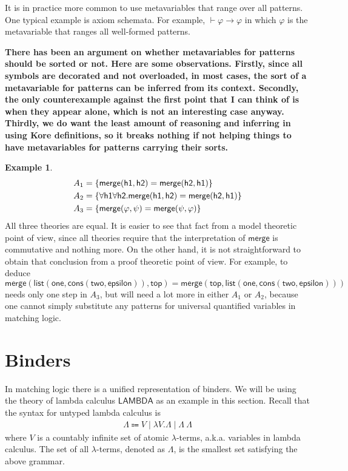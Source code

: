 \documentclass[UTF8]{article}
\newcommand{\comment}[1]
    {\par {\bfseries \color{blue} #1 \par}} %
\newcounter{thmcounter}
\theoremstyle{plain}
\theoremstyle{definition}
\newtheorem{example}[thmcounter]{Example}
\theoremstyle{remark}
\newcommand{\LAMBDA}{\mathsf{LAMBDA}}
\begin{document}
It is in practice more common to use metavariables that range over all patterns. One typical example is axiom schemata. For example, $\vdash \varphi \to \varphi$ in which $\varphi$ is the metavariable that ranges all well-formed patterns. 

\comment{There has been an argument on whether metavariables for patterns should be sorted or not. Here are some observations. Firstly, since all symbols are decorated and not overloaded, in most cases, the sort of a metavariable for patterns can be inferred from its context. Secondly, the only counterexample against the first point that I can think of is when they appear alone, which is not an interesting case anyway. Thirdly, we do want the least amount of reasoning and inferring in using Kore definitions, so it breaks nothing if not helping things to have metavariables for patterns carrying their sorts.}

\begin{example}
\begin{align*}
A_1 &= \{{\sf merge(h1, h2) = merge(h2, h1)}\} \\
A_2 &= \{{\sf \forall h1 \forall h2 . merge(h1, h2) = merge(h2, h1)}\} \\
A_3 &= \{\mathsf{merge}(\varphi, \psi) = \mathsf{merge}(\psi, \varphi)\}
\end{align*}
All three theories are equal. It is easier to see that fact from a model theoretic point of view, since all theories require that the interpretation of $\mathsf{merge}$ is commutative and nothing more. On the other hand, it is not straightforward to obtain that conclusion from a proof theoretic point of view. For example, to deduce $\mathsf{merge}(\mathsf{list}(\mathsf{one}, \mathsf{cons}(\mathsf{two}, \mathsf{epsilon})), \mathsf{top}) = \mathsf{merge}(\mathsf{top}, \mathsf{list}(\mathsf{one}, \mathsf{cons}(\mathsf{two}, \mathsf{epsilon})))$ needs only one step in $A_3$, but will need a lot more in either $A_1$ or $A_2$, because one cannot simply substitute any patterns for universal quantified variables in matching logic.

\end{example}



\section{Binders}

In matching logic there is a unified representation of binders. We will be using the theory of lambda calculus $\LAMBDA$ as an example in this section. Recall that the syntax for untyped lambda calculus is
\begin{align*}
\Lambda \Coloneqq V \mid \lambda V . \Lambda \mid \Lambda \ \Lambda
\end{align*}
where $V$ is a countably infinite set of atomic $\lambda$-terms, a.k.a. variables in lambda calculus. The set of all $\lambda$-terms, denoted as $\Lambda$, is the smallest set satisfying the above grammar.
\end{document}
